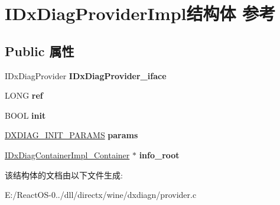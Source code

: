 \hypertarget{struct_i_dx_diag_provider_impl}{}\section{I\+Dx\+Diag\+Provider\+Impl结构体 参考}
\label{struct_i_dx_diag_provider_impl}
\subsection*{Public 属性}
\begin{DoxyCompactItemize}
\item 
\mbox{\label{struct_i_dx_diag_provider_impl_a529f14f4ff3a3d024759d0e7f41fcf1f}} 
I\+Dx\+Diag\+Provider {\bfseries I\+Dx\+Diag\+Provider\+\_\+iface}
\item 
\mbox{\label{struct_i_dx_diag_provider_impl_a718020f7400567930899eae4d28a61d9}} 
L\+O\+NG {\bfseries ref}
\item 
\mbox{\label{struct_i_dx_diag_provider_impl_a5833604870a76c0d483c75db6bcc8fee}} 
B\+O\+OL {\bfseries init}
\item 
\mbox{\label{struct_i_dx_diag_provider_impl_af13ab07aef4aa2e44ac88d563b3e27ef}} 
\hyperlink{struct___d_x_d_i_a_g___i_n_i_t___p_a_r_a_m_s}{D\+X\+D\+I\+A\+G\+\_\+\+I\+N\+I\+T\+\_\+\+P\+A\+R\+A\+MS} {\bfseries params}
\item 
\mbox{\label{struct_i_dx_diag_provider_impl_a167301b36cb727f5aa110695a5bcb449}} 
\hyperlink{struct_i_dx_diag_container_impl___container}{I\+Dx\+Diag\+Container\+Impl\+\_\+\+Container} $\ast$ {\bfseries info\+\_\+root}
\end{DoxyCompactItemize}


该结构体的文档由以下文件生成\+:\begin{DoxyCompactItemize}
\item 
E\+:/\+React\+O\+S-\/0../dll/directx/wine/dxdiagn/provider.\+c\end{DoxyCompactItemize}
